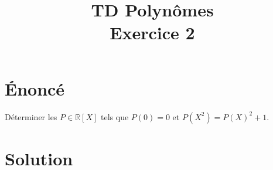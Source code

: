\documentclass[french]{article}
\title{TD Polynômes \\ Exercice 2}
\date{}
\newcommand{\R}{\mathbb{R}}
\begin{document}
	\maketitle
	
	\section{Énoncé}
	Déterminer les $P\in\R[X]$ tels que $P(0)=0$ et $P(X^2)=P(X)^2+1$.
	\section{Solution}
	
\end{document}
